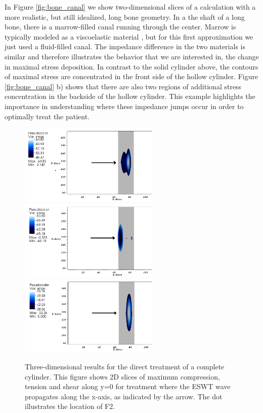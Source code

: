 \documentclass{article}
\begin{document}
In Figure \ref{fig:bone_canal} we show two-dimensional slices of a calculation with a more realistic, but still idealized, long bone geometry.  In a the shaft of a long bone, there is a marrow-filled canal running through the center.  Marrow is typically modeled as a viscoelastic material \cite{martin_burr_sharkey}, but for this first approximation we just used a fluid-filled canal.  The impedance difference in the two materials is similar and therefore illustrates the behavior that we are interested in, the change in maximal stress deposition.  In contrast to the solid cylinder above, the contours of maximal stress are concentrated in the front side of the hollow cylinder.  Figure \ref{fig:bone_canal} b) shows that there are also two regions of additional stress concentration in the backside of the hollow cylinder.  This example highlights the importance in understanding where these impedance jumps occur in order to optimally treat the patient.

\begin{figure}[h!]
\includegraphics[height=1.5in]{cylinder/cylinder_comp_90_blue_2D_new.png}
\includegraphics[height=1.5in]{cylinder/cylinder_tens_90_blue_2D_new.png}
\includegraphics[height=1.5in]{cylinder/cylinder_shear_90_blue_2D_new.png}
\caption{Three-dimensional results for the direct treatment of a complete cylinder.  This figure shows 2D slices of maximum compression, tension and shear along y=0 for treatment where the ESWT wave propagates along the x-axis, as indicated by the arrow.  The dot illustrates the location of F2.}
\label{fig:90cylin}
\end{figure}
\end{document}
